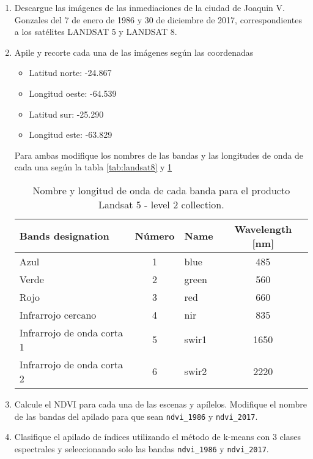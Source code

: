 \begin{enumerate}
\item Descargue las imágenes de las inmediaciones de la ciudad de Joaquin V. Gonzales del 7 de enero de 1986 y 30 de diciembre de 2017, correspondientes a los satélites LANDSAT 5 y LANDSAT 8.

\item Apile y recorte cada una de las imágenes según las coordenadas

\begin{itemize}
    \item Latitud norte: -24.867
    \item Longitud oeste: -64.539
    \item Latitud sur: -25.290
    \item Longitud este: -63.829
\end{itemize}

Para ambas modifique los nombres de las bandas y las longitudes de onda de cada una según la tabla \ref{tab:landsat8} y \ref{tab:landsat5}

\begin{table}[h!]
  \centering
  \begin{tabular}{@{}lclc@{}}
  \toprule
  Bands designation          & Número & Name  & Wavelength {[}nm{]} \\ \midrule
  Azul                       & 1      & blue  & 485                 \\
  Verde                      & 2      & green & 560                 \\
  Rojo                       & 3      & red   & 660                 \\
  Infrarrojo cercano         & 4      & nir   & 835                 \\
  Infrarrojo de onda corta 1 & 5      & swir1 & 1650                \\
  Infrarrojo de onda corta 2 & 6      & swir2 & 2220                \\ \bottomrule
  \end{tabular}
\caption{Nombre y longitud de onda de cada banda para el producto Landsat 5 - level 2 collection.}
\label{tab:landsat5}
\end{table}

\item Calcule el NDVI para cada una de las escenas y apílelos. Modifique el nombre de las bandas del apilado para que sean \texttt{ndvi\_1986} y \texttt{ndvi\_2017}.

\item Clasifique el apilado de índices utilizando el método de k-means con 3 clases espectrales y seleccionando solo las bandas \texttt{ndvi\_1986} y \texttt{ndvi\_2017}.


\end{enumerate}
